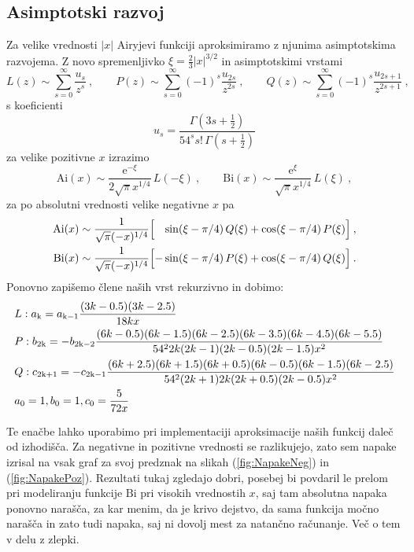 \documentclass[12pt]{article}
\newcommand{\Ai}{\mathrm{Ai}}
\newcommand{\Bi}{\mathrm{Bi}}
\begin{document}
\subsection{Asimptotski razvoj}
Za velike vrednosti $|x|$ Airyjevi funkciji aproksimiramo
z njunima asimp\-tot\-ski\-ma razvojema.  Z novo spremenljivko
$\xi=\frac{2}{3} |x|^{3/2}$ in asimptotskimi vrstami
%
\begin{equation*}
    L(z) \sim \sum_{s=0}^\infty \frac{u_s}{z^s}\>,\qquad
    P(z) \sim \sum_{s=0}^\infty (-1)^s \frac{u_{2s}}{z^{2 s}}\>,\qquad
    Q(z) \sim \sum_{s=0}^\infty (-1)^s \frac{u_{2s+1}}{z^{2 s+1}}\>,
\end{equation*}
s koeficienti
\begin{equation*}
    u_s = \frac{ \Gamma(3s + \frac{1}{2})}
    {54^s s!\, \Gamma(s + \frac{1}{2}) }
\end{equation*}
za velike pozitivne $x$ izrazimo
%
\begin{equation*}
    \Ai(x)\sim  \frac{\mathrm{e}^{-\xi}}{2\sqrt{\pi} x^{1/4}} \, L(-\xi) \>, \qquad
    \Bi(x)\sim  \frac{\mathrm{e}^{\xi}} { \sqrt{\pi} x^{1/4}} \, L(\xi)\>,
\end{equation*}
%
za po absolutni vrednosti velike negativne $x$ pa
%
%
\begin{align*}
    \Ai(x) & \sim  \frac{1}{\sqrt{\pi} (-x)^{1/4}}
    \Bigl[ \phantom{-}\sin(\xi-\pi/4) \, Q(\xi)
    + \cos(\xi-\pi/4) \, P(\xi)\Bigr] \>,          \\
    \Bi(x) & \sim  \frac{1}{\sqrt{\pi} (-x)^{1/4}}
    \Bigl[ - \sin(\xi-\pi/4) \, P(\xi)
        + \cos(\xi-\pi/4) \, Q(\xi)\Bigr]\>.
\end{align*}
Ponovno zapišemo člene naših vrst rekurzivno in dobimo:
\begin{align*}
     & L: a_{\rm k}     = a_{\rm k-1} \frac{(3k-0.5) (3k-2.5)}{18k x}                                                                \\
     & P: b_{\rm 2k}    = - b_{\rm 2k-2} \frac{(6k-0.5)(6k-1.5)(6k-2.5)(6k-3.5)(6k-4.5)(6k-5.5)}{54^2 2k (2k-1)(2k-0.5)(2k-1.5) x^2} \\
     & Q: c_{\rm 2k+1}  = - c_{\rm 2k -1} \frac{(6k+2.5)(6k+1.5)(6k+0.5)(6k-0.5)(6k-1.5)(6k-2.5)}{54^2 (2k+1)2k(2k+0.5)(2k-0.5) x^2} \\
     & a_0 = 1, b_0 = 1, c_0 = \frac{5}{72x}
\end{align*}

Te enačbe lahko uporabimo pri implementaciji aproksimacije naših funkcij daleč od izhodišča. Za negativne in pozitivne vrednosti se razlikujejo, zato sem napake izrisal na vsak graf za svoj predznak na slikah (\ref{fig:NapakeNeg}) in (\ref{fig:NapakePoz}). Rezultati tukaj zgledajo dobri, posebej bi povdaril le prelom pri modeliranju funkcije $\Bi$ pri visokih vrednostih $x$, saj tam absolutna napaka ponovno narašča, za kar menim, da je krivo dejstvo, da sama funkcija močno narašča in zato tudi napaka, saj ni dovolj mest za natančno računanje. Več o tem v delu z zlepki.
\end{document}

